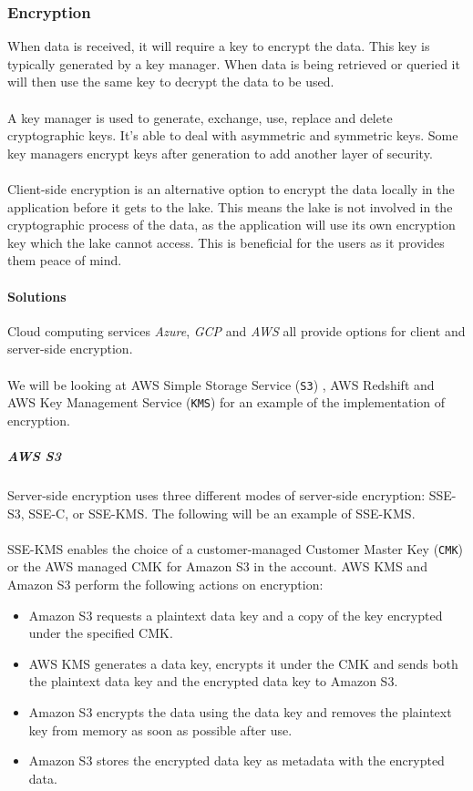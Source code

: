 \documentclass[10pt]{article}
\begin{document}
\subsubsection{Encryption}

When data is received, it will require a key to encrypt the data. This key is typically generated by a key manager. When data is being retrieved or queried it will then use the same key to decrypt the data to be used.
\\ \\
A key manager is used to generate, exchange, use, replace and delete cryptographic keys. It's able to deal with asymmetric and symmetric keys. Some key managers encrypt keys after generation to add another layer of security.
\\ \\
Client-side encryption is an alternative option to encrypt the data locally in the application before it gets to the lake. This means the lake is not involved in the cryptographic process of the data, as the application will use its own encryption key which the lake cannot access. This is beneficial for the users as it provides them peace of mind.
\paragraph{Solutions} 
Cloud computing services \textit{Azure}, \textit{GCP} and \textit{AWS} all provide options for client and server-side encryption.
\\ \\
We will be looking at AWS Simple Storage Service (\texttt{S3}) \cite{encryption-in-s3}, AWS Redshift \cite{encryption-in-redshift} and AWS Key Management Service (\texttt{KMS}) for an example of the implementation of encryption.
\subparagraph{AWS S3}
Server-side encryption uses three different modes of server-side encryption: SSE-S3, SSE-C, or SSE-KMS. The following will be an example of SSE-KMS.
\\ \\ 
SSE-KMS enables the choice of a customer-managed Customer Master Key (\texttt{CMK}) or the AWS managed CMK for Amazon S3 in the account. AWS KMS and Amazon S3 perform the following actions on encryption:
\begin{itemize}
  \item Amazon S3 requests a plaintext data key and a copy of the key encrypted under the specified CMK.
  \item AWS KMS generates a data key, encrypts it under the CMK and sends both the plaintext data key and the encrypted data key to Amazon S3.
  \item Amazon S3 encrypts the data using the data key and removes the plaintext key from memory as soon as possible after use.
  \item Amazon S3 stores the encrypted data key as metadata with the encrypted data.
\end{itemize}
\end{document}
